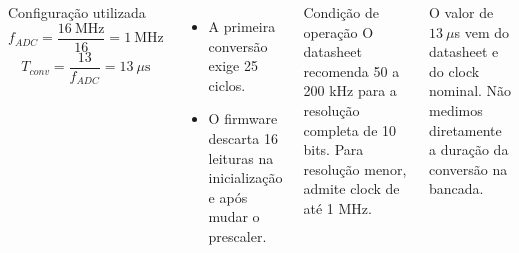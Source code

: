\begin{columns}[T]
\begin{block}{Configuração utilizada}
\[
f_{ADC}=\frac{16\ \text{MHz}}{16}=1\ \text{MHz}
\]
\[
T_{conv}=\frac{13}{f_{ADC}}=13\ \mu\text{s}
\]
\end{block}
\begin{itemize}
\item A primeira conversão exige 25 ciclos.
\item O firmware descarta 16 leituras na inicialização e após mudar o prescaler.
\end{itemize}
\begin{alertblock}{Condição de operação}
O datasheet recomenda 50 a 200 kHz para a resolução completa de 10 bits. Para resolução menor, admite clock de até 1 MHz.
\end{alertblock}
\small O valor de $13\ \mu$s vem do datasheet e do clock nominal. Não medimos diretamente a duração da conversão na bancada.
\end{columns}
